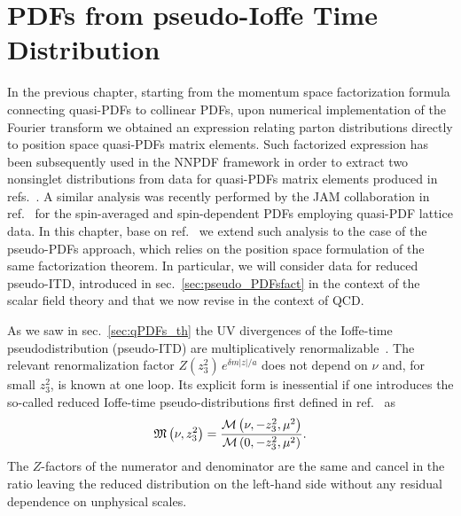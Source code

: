 \chapter{PDFs from pseudo-Ioffe Time Distribution}
\label{ch:ppdf_NNPDF}
In the previous chapter, 
starting from the momentum space factorization formula connecting quasi-PDFs to collinear PDFs,
upon numerical implementation of the Fourier transform we obtained an expression relating
parton distributions directly to position space quasi-PDFs matrix elements.
Such factorized expression has been subsequently used in the NNPDF framework in order to 
extract two nonsinglet distributions from data for quasi-PDFs matrix elements 
produced in refs.~\cite{Alexandrou:2018pbm, Alexandrou:2019lfo}.
A similar analysis was recently performed by the JAM collaboration in ref.~\cite{Bringewatt:2020ixn} 
for the spin-averaged and spin-dependent PDFs employing quasi-PDF lattice data.  
In this chapter, base on ref.~\cite{DelDebbio:2020rgv} we extend such analysis to the case of the pseudo-PDFs approach,
which relies on the position space formulation of the same factorization theorem. 
In particular, we will consider data for reduced pseudo-ITD, introduced in sec.~\ref{sec:pseudo_PDFsfact}
in the context of the scalar field theory and that we now revise in the context of QCD.

%
As we saw in sec.~\ref{sec:qPDFs_th} the UV divergences of the Ioffe-time pseudodistribution (pseudo-ITD)
are multiplicatively renormalizable~\cite{Ji:2017oey,Ishikawa:2017faj}. 
The relevant renormalization factor $Z(z_3^2)\,e^{\delta m |z|/a}$ does not depend on $\nu$ and, 
for small $z_3^2$,   is known at one loop. 
Its explicit form is inessential if one introduces the so-called reduced 
Ioffe-time pseudo-distributions first defined in ref.~\cite{Radyushkin:2017cyf}
as 
\begin{align}
	\label{eq:reducedIoffe}
	\mathfrak{M}\left(\nu, z_3^2\right) = \frac{\mathcal{M}\left( \nu,-z_3^2, \mu^2 \right)}{\mathcal{M}\left( 0,-z_3^2, \mu^2 \right)}. 
\end{align}
The $Z$-factors of the numerator and denominator are the same and cancel in the ratio leaving the reduced distribution
on the left-hand side without any residual dependence on 
unphysical scales. 


